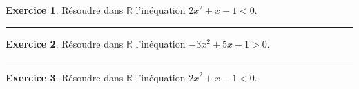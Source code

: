 \documentclass{exam}
\title{\Document\ \Titre \Type}
\theoremstyle{definition}
\newtheorem{exercice}{Exercice}
\begin{document}
\large


\begin{exercice}
    Résoudre dans \( \mathbb{R} \) l'inéquation \(2x^2 + x - 1 < 0\).
    \begin{center}
        \framebox[1\textwidth]{\parbox{5.5in}{
        \vspace{10em}}}
    \end{center}
\end{exercice}

\hrule

\vspace{1em}
\setcounter{exercice}{0}


\begin{exercice}
    Résoudre dans \( \mathbb{R} \) l'inéquation \(-3x^2 + 5x - 1 > 0\).
    \begin{center}
        \framebox[1\textwidth]{\parbox{5.5in}{
        \vspace{10em}}}
    \end{center}
\end{exercice}

\hrule

\vspace{1em}
\setcounter{exercice}{0}


\begin{exercice}
    Résoudre dans \( \mathbb{R} \) l'inéquation \(2x^2 + x - 1 < 0\).
    \begin{center}
        \framebox[1\textwidth]{\parbox{5.5in}{
        \vspace{10em}}}
    \end{center}
\end{exercice}
\end{document}
